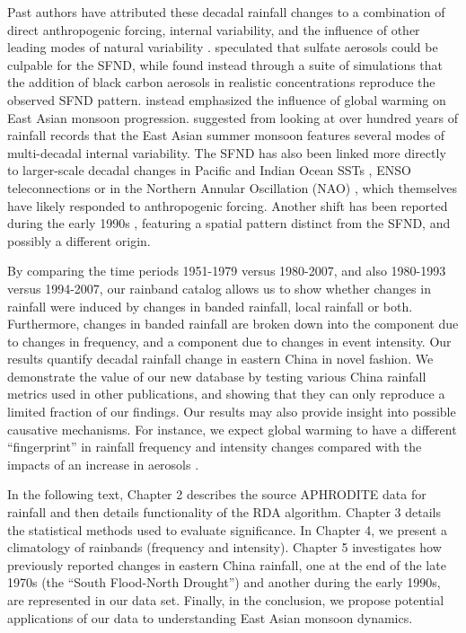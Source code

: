 \documentclass[9pt,twocolumn,twoside,lineno]{pnas-new}
\begin{document}
	 Past authors have attributed these decadal rainfall changes to a combination of direct anthropogenic forcing, internal variability, and the influence of other leading modes of natural variability \citep{Zhou2009}. \citet{Xu2001} speculated that sulfate aerosols could be culpable for the SFND, while \citet{Menon2002} found instead through a suite of simulations that the addition of black carbon aerosols in realistic concentrations reproduce the observed SFND pattern. \citet{Li2010,Zhao2010} instead emphasized the influence of global warming on East Asian monsoon progression. \citet{Ding2008} suggested from looking at over hundred years of rainfall records that the East Asian summer monsoon features several modes of multi-decadal internal variability. The SFND has also been linked more directly to larger-scale decadal changes in Pacific and Indian Ocean SSTs \citep{Gong2002}, ENSO teleconnections \citep{Xie2010} or in the Northern Annular Oscillation (NAO) \citep{Xin2006,Yu2007}, which themselves have likely responded to anthropogenic forcing. Another shift has been reported during the early 1990s \citep{Wu2010,Zhang2014}, featuring a spatial pattern distinct from the SFND, and possibly a different origin.
	 
	 By comparing the time periods 1951-1979 versus 1980-2007, and also 1980-1993 versus 1994-2007, our rainband catalog allows us to show whether changes in rainfall were induced by changes in banded rainfall, local rainfall or both. Furthermore, changes in banded rainfall are broken down into the component due to changes in frequency, and a component due to changes in event intensity. Our results quantify decadal rainfall change in eastern China in novel fashion. We demonstrate the value of our new database by testing various China rainfall metrics used in other publications, and showing that they can only reproduce a limited fraction of our findings. Our results may also provide insight into possible causative mechanisms. For instance, we expect global warming to have a different ``fingerprint'' in rainfall frequency and intensity changes \citep{Trenberth2011a,Pendergrass2014b} compared with the impacts of an increase in aerosols \citep{Wang2016}.
	 
	 In the following text, Chapter 2 describes the source APHRODITE data for rainfall and then details functionality of the RDA algorithm. Chapter 3 details the statistical methods used to evaluate significance. In Chapter 4, we present a climatology of rainbands (frequency and intensity). Chapter 5 investigates how previously reported changes in eastern China rainfall, one at the end of the late 1970s (the ``South Flood-North Drought'') and another during the early 1990s, are represented in our data set. Finally, in the conclusion, we propose potential applications of our data to understanding East Asian monsoon dynamics.
\end{document}
